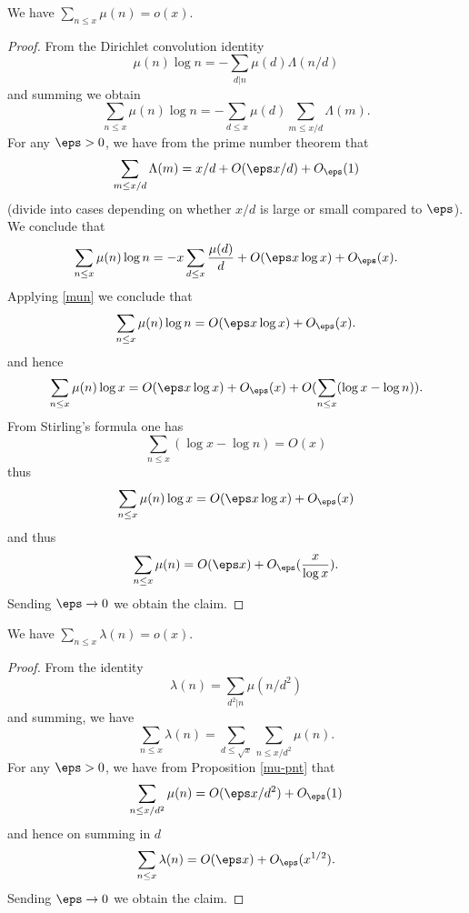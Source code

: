 \begin{proposition}\label{mu-pnt}  We have $\sum_{n \leq x} \mu(n) = o(x)$.
\end{proposition}

\begin{proof}  From the Dirichlet convolution identity
  $$ \mu(n) \log n = - \sum_{d|n} \mu(d) \Lambda(n/d)$$
and summing we obtain
$$ \sum_{n \leq x} \mu(n) \log n = - \sum_{d \leq x} \mu(d) \sum_{m \leq x/d} \Lambda(m).$$
For any $\eps>0$, we have from the prime number theorem that
$$ \sum_{m \leq x/d} \Lambda(m) = x/d + O(\eps x/d) + O_\eps(1)$$
(divide into cases depending on whether $x/d$ is large or small compared to $\eps$).
We conclude that
$$ \sum_{n \leq x} \mu(n) \log n = - x \sum_{d \leq x} \frac{\mu(d)}{d} + O(\eps x \log x) + O_\eps(x).$$
Applying \eqref{mun} we conclude that
$$ \sum_{n \leq x} \mu(n) \log n = O(\eps x \log x) + O_\eps(x).$$
and hence
$$ \sum_{n \leq x} \mu(n) \log x = O(\eps x \log x) + O_\eps(x) + O( \sum_{n \leq x} (\log x - \log n) ).$$
From Stirling's formula one has
$$  \sum_{n \leq x} (\log x - \log n) = O(x)$$
thus
$$ \sum_{n \leq x} \mu(n) \log x = O(\eps x \log x) + O_\eps(x)$$
and thus
$$ \sum_{n \leq x} \mu(n) = O(\eps x) + O_\eps(\frac{x}{\log x}).$$
Sending $\eps \to 0$ we obtain the claim.
\end{proof}


\begin{proposition}  We have $\sum_{n \leq x} \lambda(n) = o(x)$.
\end{proposition}

\begin{proof}  From the identity
  $$ \lambda(n) = \sum_{d^2|n} \mu(n/d^2)$$
and summing, we have
$$ \sum_{n \leq x} \lambda(n) = \sum_{d \leq \sqrt{x}} \sum_{n \leq x/d^2} \mu(n).$$
For any $\eps>0$, we have from Proposition \ref{mu-pnt} that
$$ \sum_{n \leq x/d^2} \mu(n) = O(\eps x/d^2) + O_\eps(1)$$
and hence on summing in $d$
$$ \sum_{n \leq x} \lambda(n) = O(\eps x) + O_\eps(x^{1/2}).$$
Sending $\eps \to 0$ we obtain the claim.
\end{proof}
